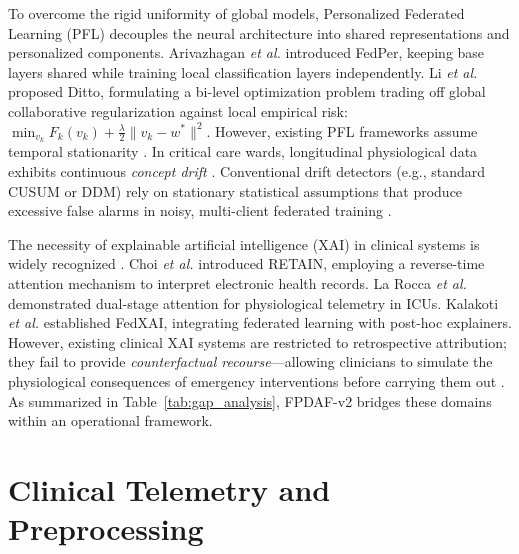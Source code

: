 \documentclass[journal,twocolumn,10pt]{IEEEtran}
\begin{document}
To overcome the rigid uniformity of global models, Personalized Federated Learning (PFL) decouples the neural architecture into shared representations and personalized components. Arivazhagan \textit{et al.} \cite{arivazhagan2020} introduced FedPer, keeping base layers shared while training local classification layers independently. Li \textit{et al.} \cite{li2021ditto} proposed Ditto, formulating a bi-level optimization problem trading off global collaborative regularization against local empirical risk: $\min_{v_k} F_k(v_k) + \frac{\lambda}{2} \|v_k - w^*\|^2$. However, existing PFL frameworks assume temporal stationarity \cite{wang2025personalized,yuan2024trend}. In critical care wards, longitudinal physiological data exhibits continuous \textit{concept drift} \cite{jothimurugesan2022,bernardi2023adaptive}. Conventional drift detectors (e.g., standard CUSUM or DDM) rely on stationary statistical assumptions that produce excessive false alarms in noisy, multi-client federated training \cite{bernardi2023adaptive}.

The necessity of explainable artificial intelligence (XAI) in clinical systems is widely recognized \cite{lundberg2018explainable,sundararajan2017axiomatic}. Choi \textit{et al.} \cite{choi2016retain} introduced RETAIN, employing a reverse-time attention mechanism to interpret electronic health records. La Rocca \textit{et al.} \cite{larocca2021attention} demonstrated dual-stage attention for physiological telemetry in ICUs. Kalakoti \textit{et al.} \cite{kalakoti2025fedxai} established FedXAI, integrating federated learning with post-hoc explainers. However, existing clinical XAI systems are restricted to retrospective attribution; they fail to provide \textit{counterfactual recourse}---allowing clinicians to simulate the physiological consequences of emergency interventions before carrying them out \cite{larocca2022shap}. As summarized in Table~\ref{tab:gap_analysis}, FPDAF-v2 bridges these domains within an operational framework.

\section{Clinical Telemetry and Preprocessing}
\end{document}
